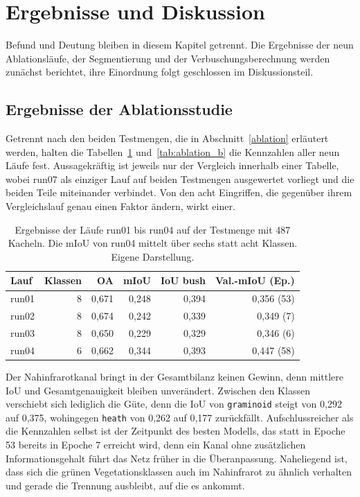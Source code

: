 \newpage
\section{Ergebnisse und Diskussion}\label{diskussion}

Befund und Deutung bleiben in diesem Kapitel getrennt. Die Ergebnisse der neun Ablationsläufe, der Segmentierung und der Verbuschungsberechnung werden zunächst berichtet, ihre Einordnung folgt geschlossen im Diskussionsteil.

\subsection{Ergebnisse der Ablationsstudie}\label{ergebnis_ablation}

Getrennt nach den beiden Testmengen, die in Abschnitt~\ref{ablation} erläutert werden, halten die Tabellen~\ref{tab:ablation_a} und~\ref{tab:ablation_b} die Kennzahlen aller neun Läufe fest. Aussagekräftig ist jeweils nur der Vergleich innerhalb einer Tabelle, wobei run07 als einziger Lauf auf beiden Testmengen ausgewertet vorliegt und die beiden Teile miteinander verbindet. Von den acht Eingriffen, die gegenüber ihrem Vergleichslauf genau einen Faktor ändern, wirkt einer.

\begin{table}[H]
    \centering
    \caption[Ergebnisse der Läufe run01 bis run04]{Ergebnisse der Läufe run01
    bis run04 auf der Testmenge mit 487 Kacheln. Die mIoU von run04 mittelt
    über sechs statt acht Klassen. Eigene Darstellung.}
    \label{tab:ablation_a}
    \begin{tabular}{lrrrrr}
    \hline
    Lauf & Klassen & OA & mIoU & IoU bush & Val.-mIoU (Ep.) \\
    \hline
    run01 & 8 & 0,671 & 0,248 & 0,394 & 0,356 (53) \\
    run02 & 8 & 0,674 & 0,242 & 0,339 & 0,349 (7)  \\
    run03 & 8 & 0,650 & 0,229 & 0,329 & 0,346 (6)  \\
    run04 & 6 & 0,662 & 0,344 & 0,393 & 0,447 (58) \\
    \hline
    \end{tabular}
\end{table}

Der Nahinfrarotkanal bringt in der Gesamtbilanz keinen Gewinn, denn mittlere IoU und Gesamtgenauigkeit bleiben unverändert. Zwischen den Klassen verschiebt sich lediglich die Güte, denn die IoU von \texttt{graminoid} steigt von 0,292 auf 0,375, wohingegen \texttt{heath} von 0,262 auf 0,177 zurückfällt. Aufschlussreicher als die Kennzahlen selbst ist der Zeitpunkt des besten Modells, das statt in Epoche 53 bereits in Epoche 7 erreicht wird, denn ein Kanal ohne zusätzlichen Informationsgehalt führt das Netz früher in die Überanpassung. Naheliegend ist, dass sich die grünen Vegetationsklassen auch im Nahinfrarot zu ähnlich verhalten und gerade die Trennung ausbleibt, auf die es ankommt.

